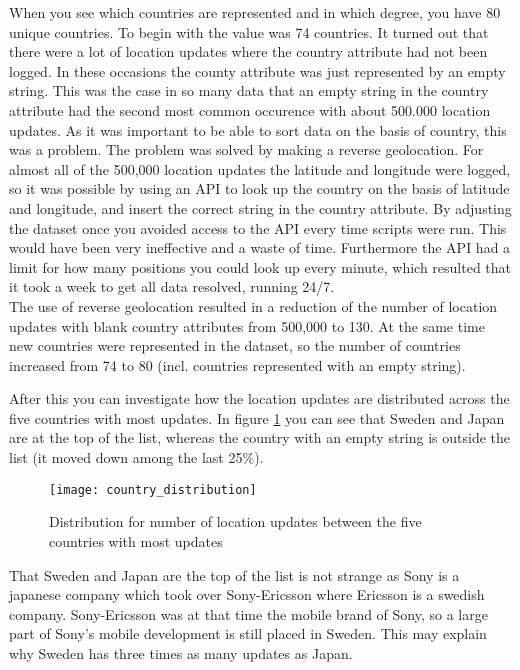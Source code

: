 When you see which countries are represented and in which degree, you have 80 unique countries. To begin with the value was 74 countries. It turned out that there were a lot of location updates where the country attribute had not been logged. In these occasions the county attribute was just represented by an empty string. This was the case in so many data that an empty string in the country attribute had the second most common occurence with about 500.000 location updates. 
As it was important to be able to sort data on the basis of country, this was a problem. The problem was solved by making a reverse geolocation. For almost all of the 500,000 location updates the latitude and longitude were logged, so it was possible by using an API\cite{reversegeocode} to look up the country on the basis of latitude and longitude, and insert the correct string in the country attribute. By adjusting the dataset once you avoided access to the API every time scripts were run. This would have been very ineffective and a waste of time. Furthermore the API had a limit for how many positions you could look up every minute, which resulted that it took a week to get all data resolved, running 24/7.  \\ 
The use of reverse geolocation resulted in a reduction of the number of location updates with blank country attributes from 500,000 to 130. At the same time new countries were represented in the dataset, so the number of countries increased from 74 to 80 (incl. countries represented with an empty string). 


After this you can investigate how the location updates are distributed across the five countries with most updates. In figure \ref{fig:country_dist} you can see that Sweden and Japan are at the top of the list, whereas the country with an empty string is outside the list (it moved down among the last 25\%). 


\begin{figure}[H]
    \hspace*{-1.0cm}
    \centering
    \texttt{[image: country\_distribution]}
    \caption{Distribution for number of location updates between the five countries with most updates}
    \label{fig:country_dist}
\end{figure}


That Sweden and Japan are the top of the list is not strange as Sony is a japanese company which took over Sony-Ericsson where Ericsson is a swedish company. Sony-Ericsson was at that time the mobile brand of Sony, so a large part of Sony's mobile development is still placed in Sweden. This may explain why Sweden has three times as many updates as Japan.  

